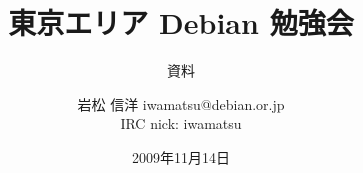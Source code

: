 




\documentclass[cjk,dvipdfmx,12pt]{beamer}
\usepackage{monthlypresentation}


\title{東京エリア Debian 勉強会}
\subtitle{資料}
\author{岩松 信洋 iwamatsu@debian.or.jp\\IRC nick: iwamatsu}
\date{2009年11月14日}



